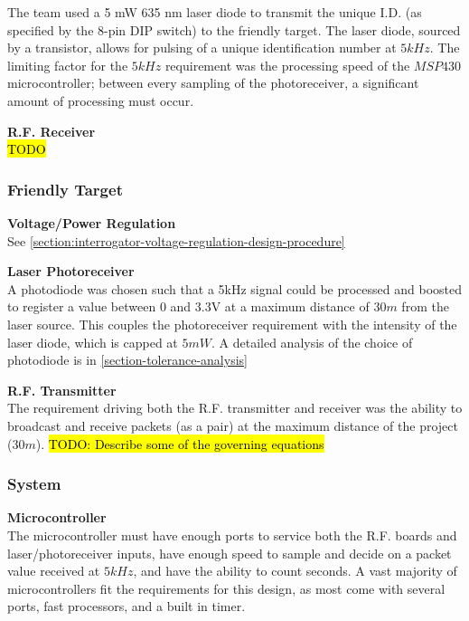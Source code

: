 \documentclass[letterpaper,10pt]{article}
\begin{document}
\begin{spacing}{1.15}
The team used a 5 mW 635 nm laser diode to transmit the unique I.D. (as specified by the 8-pin DIP switch) to the friendly target. The laser diode, sourced by a transistor, allows for pulsing of a unique identification number at $5kHz$. The limiting factor for the $5kHz$ requirement was the processing speed of the $MSP430$ microcontroller; between every sampling of the photoreceiver, a significant amount of processing must occur. 

\hspace{5mm}\textbf{R.F. Receiver} \label{section:rf-receiver-design-procedure}
\\ \hl{TODO}

\subsubsection{Friendly Target}
\hspace{5mm}\textbf{Voltage/Power Regulation} \label{section:target-voltage-regulation-design-procedure} \\
See \ref{section:interrogator-voltage-regulation-design-procedure}

\hspace{5mm}\textbf{Laser Photoreceiver} \label{section:laser-photoreceiver-design-procedure}\\
A photodiode was chosen such that a 5kHz signal could be processed and boosted to register a value between 0 and 3.3V at a maximum distance of $30m$ from the laser source. This couples the photoreceiver requirement with the intensity of the laser diode, which is capped at $5 mW$. A detailed analysis of the choice of photodiode is in \ref{section-tolerance-analysis}

\hspace{5mm}\textbf{R.F. Transmitter} \label{section:rf-transmitter-design-procedure} \\
The requirement driving both the R.F. transmitter and receiver was the ability to broadcast and receive packets (as a pair) at the maximum distance of the project ($30m$). 
\hl{TODO: Describe some of the governing equations}


\subsubsection{System}
\hspace{5mm}\textbf{Microcontroller} \label{section:system-design-procedure}\\
The microcontroller must have enough ports to service both the R.F. boards and laser/photoreceiver inputs, have enough speed to sample and decide on a packet value received at $5kHz$, and have the ability to count seconds. A vast majority of microcontrollers fit the requirements for this design, as most come with several ports, fast processors, and a built in timer.


\end{spacing}
\end{document}
